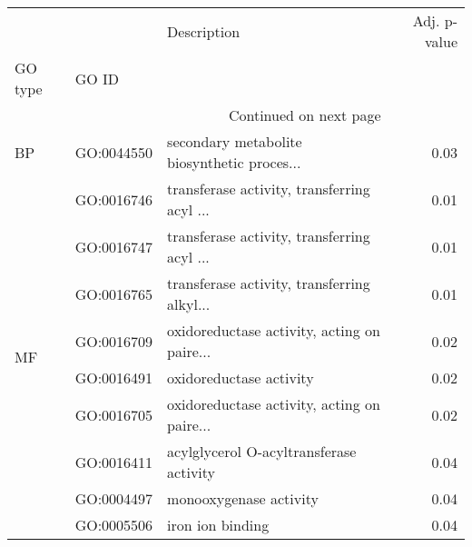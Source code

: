\begin{longtable}{lllr}
\toprule
   &            &                                  Description &  Adj. p-value \\
GO type & GO ID &                                              &               \\
\midrule
\endhead
\midrule
\multicolumn{3}{r}{{Continued on next page}} \\
\midrule
\endfoot

\bottomrule
\endlastfoot
BP & GO:0044550 &  secondary metabolite biosynthetic proces... &          0.03 \\
\multirow{9}{*}{MF} & GO:0016746 &  transferase activity, transferring acyl ... &          0.01 \\
   & GO:0016747 &  transferase activity, transferring acyl ... &          0.01 \\
   & GO:0016765 &  transferase activity, transferring alkyl... &          0.01 \\
   & GO:0016709 &  oxidoreductase activity, acting on paire... &          0.02 \\
   & GO:0016491 &                      oxidoreductase activity &          0.02 \\
   & GO:0016705 &  oxidoreductase activity, acting on paire... &          0.02 \\
   & GO:0016411 &      acylglycerol O-acyltransferase activity &          0.04 \\
   & GO:0004497 &                       monooxygenase activity &          0.04 \\
   & GO:0005506 &                             iron ion binding &          0.04 \\
\end{longtable}
